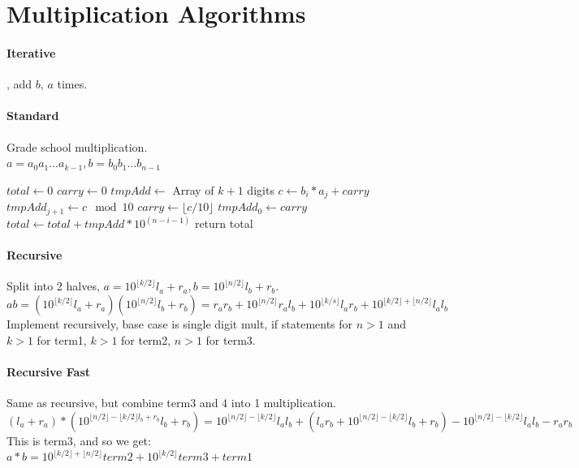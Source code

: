 \section{Multiplication Algorithms}
\paragraph{Iterative}, add $b$, $a$ times.
\paragraph{Standard} Grade school multiplication.\\
$a=a_0a_1\ldots a_{k-1},b=b_0b_1\ldots b_{n-1}$
\begin{algorithmic}
	\State $total \gets 0$
		\State $carry \gets 0$
		\State $tmpAdd \gets$ Array of $k+1$ digits
			\State $c\gets b_i*a_j+carry$
			\State $tmpAdd_{j+1}\gets c \mod 10$
			\State $carry \gets \lfloor c/10 \rfloor$
		\EndFor
		\State $tmpAdd_0 \gets carry$
		\State $total \gets total+tmpAdd*10^{(n-i-1)}$
	\EndFor
	\State return total
\end{algorithmic}
\paragraph{Recursive} Split into 2 halves, $a=10^{\lfloor k/2 \rfloor }l_a+r_a,b=10^{\lfloor n/2 \rfloor }l_b+r_b$.
\\$ab=(10^{\lfloor k/2 \rfloor}l_a+r_a)(10^{\lfloor n/2 \rfloor }l_b+r_b)=r_a r_b+10^{\lfloor n/2 \rfloor}r_al_b+10^{\lfloor k/s \rfloor}l_ar_b+10^{\lfloor k/2 \rfloor + \lfloor n/2 \rfloor }l_al_b$
\\ Implement recursively, base case is single digit mult, if statements for $n>1$ and $k>1$ for term1, $k>1$ for term2, $n>1$ for term3.
\paragraph{Recursive Fast} Same as recursive, but combine term3 and 4 into 1 multiplication.
\\$(l_a+r_a)*(10^{\lfloor n/2 \rfloor - \lfloor k/2 \rfloor l_b+r_b}l_b+r_b)=10^{\lfloor n/2 \rfloor - \lfloor k/2 \rfloor}l_al_b+(l_ar_b+10^{\lfloor n/2 \rfloor - \lfloor k/2 \rfloor}l_b+r_b)-10^{\lfloor n/2 \rfloor - \lfloor k/2 \rfloor}l_al_b-r_ar_b$
\\ This is term3, and so we get:
\\$a*b=10^{\lfloor k/2 \rfloor + \lfloor n/2 \rfloor}term2+10^{\lfloor k/2 \rfloor}term3+term1$
\color{Fuchsia}
